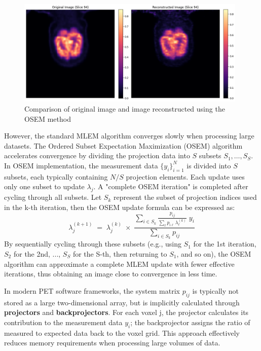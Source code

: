 \documentclass[
reprint,
superscriptaddress,
nofootinbib,
amsmath,amssymb,
aps,
prd,
]{revtex4-2}
\begin{document}
\begin{figure}[htbp]
    \centering
    \vspace{-0.2cm}
    \includegraphics[width=0.98\textwidth]{Images/output}
    \vspace{-0.2cm}
    \caption{Comparison of original image and image reconstructed using the OSEM method}
    \vspace{-0.2cm}
    \label{fig:pet_reconstruction}
\end{figure}

However, the standard MLEM algorithm converges slowly when processing large datasets. The Ordered Subset Expectation Maximization (OSEM) algorithm accelerates convergence by dividing the projection data into $S$ subsets $S_1,\dots,S_S$. In OSEM implementation, the measurement data $\{y_i\}_{i=1}^N$ is divided into $S$ subsets, each typically containing $N/S$ projection elements. Each update uses only one subset to update $\lambda_j$. A "complete OSEM iteration" is completed after cycling through all subsets.
Let $S_k$ represent the subset of projection indices used in the k-th iteration, then the OSEM update formula can be expressed as:
\begin{equation}
    \lambda_j^{(k+1)}
\;=\;
\lambda_j^{(k)}
\;\times\;
\frac{\displaystyle \sum_{i \in S_{k}} \frac{p_{ij}}{\sum_{\ell} p_{i\ell}\,\lambda_{\ell}^{(k)}} \; y_i}
{\displaystyle \sum_{i \in S_{k}} p_{ij}}
\end{equation}
By sequentially cycling through these subsets (e.g., using $S_1$ for the 1st iteration, $S_2$ for the 2nd, ..., $S_S$ for the S-th, then returning to $S_1$, and so on), the OSEM algorithm can approximate a complete MLEM update with fewer effective iterations, thus obtaining an image close to convergence in less time.

In modern PET software frameworks, the system matrix $p_{ij}$ is typically not stored as a large two-dimensional array, but is implicitly calculated through \textbf{projectors} and \textbf{backprojectors}. For each voxel j, the projector calculates its contribution to the measurement data $y_i$; the backprojector assigns the ratio of measured to expected data back to the voxel grid. This approach effectively reduces memory requirements when processing large volumes of data.
\end{document}
